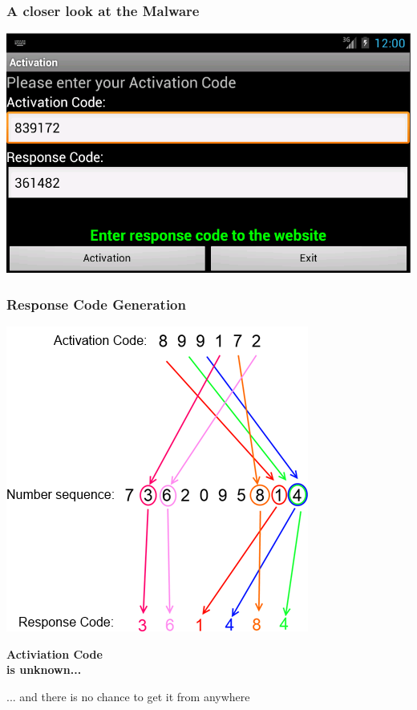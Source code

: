 \documentclass[12pt,a4paper]{beamer}
\newcommand{\mybox}[1]{\par\noindent\colorbox{shadecolor}
{\color{textcolor}\parbox{\dimexpr\textwidth-2\fboxsep\relax}{\fontsize{3em}{3.5em}\selectfont\textbf{{#1}}}}}
\begin{document}
\begin{frame}
\frametitle{A closer look at the Malware}

\centering
\includegraphics[height=0.6\textheight]{images/activation.png}
\end{frame}

\begin{frame}
\frametitle{Response Code Generation}
\centering
\includegraphics[height=0.8\textheight]{images/code_generation.png}
\end{frame}

\begin{frame}

\mybox{Activiation Code\\is unknown...}
\newline
\newline
... and there is no chance to get it from anywhere

\end{frame}
\end{document}
